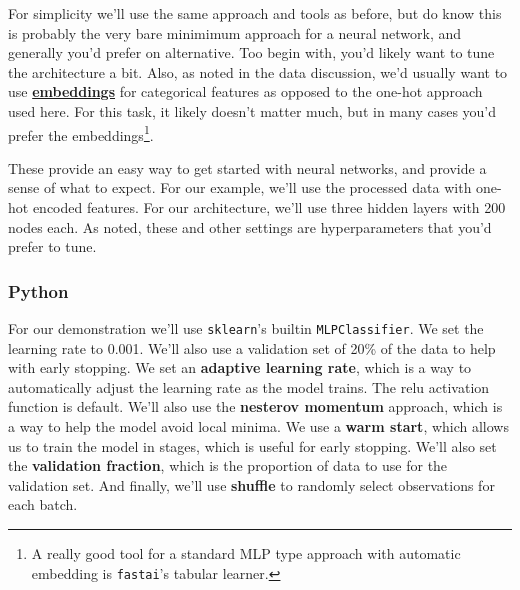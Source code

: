 \documentclass[
  letterpaper,
]{krantz}
\begin{document}
For simplicity we'll use the same approach and tools as before, but do
know this is probably the very bare minimimum approach for a neural
network, and generally you'd prefer on alternative. Too begin with,
you'd likely want to tune the architecture a bit. Also, as noted in the
data discussion, we'd usually want to use
\hyperref[data-cat]{\textbf{embeddings}} for categorical features as
opposed to the one-hot approach used here. For this task, it likely
doesn't matter much, but in many cases you'd prefer the
embeddings\footnote{A really good tool for a standard MLP type approach
  with automatic embedding is \texttt{fastai}'s tabular learner.}.

These provide an easy way to get started with neural networks, and
provide a sense of what to expect. For our example, we'll use the
processed data with one-hot encoded features. For our architecture,
we'll use three hidden layers with 200 nodes each. As noted, these and
other settings are hyperparameters that you'd prefer to tune.

\subsubsection{Python}

For our demonstration we'll use \texttt{sklearn}'s builtin
\texttt{MLPClassifier}. We set the learning rate to 0.001. We'll also
use a validation set of 20\% of the data to help with early stopping. We
set an \textbf{adaptive learning rate}, which is a way to automatically
adjust the learning rate as the model trains. The relu activation
function is default. We'll also use the \textbf{nesterov momentum}
approach, which is a way to help the model avoid local minima. We use a
\textbf{warm start}, which allows us to train the model in stages, which
is useful for early stopping. We'll also set the \textbf{validation
fraction}, which is the proportion of data to use for the validation
set. And finally, we'll use \textbf{shuffle} to randomly select
observations for each batch.
\end{document}
